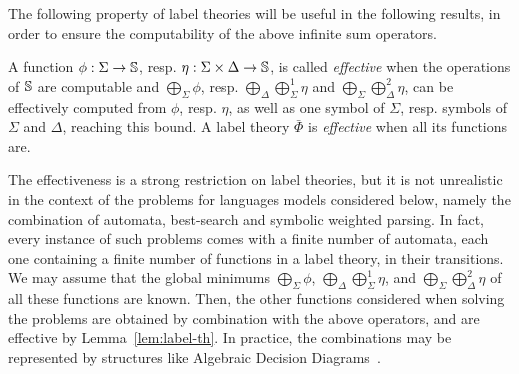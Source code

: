 



\noindent 
The following property of label theories will be useful in 
the following results, in order to ensure 
the computability of the above infinite sum operators.
%
\begin{definition}\label{def:effective}
A function $\phi: \Sigma \to \mathbb{S}$, 
resp. $\eta: \Sigma \times \Delta \to \mathbb{S}$,
is called \emph{effective} when 
the operations of $\mathbb{S}$ are computable and
$\bigoplus_{\Sigma} \phi$,
resp. $\bigoplus_{\Delta}\bigoplus^1_{\Sigma} \eta$ and $\bigoplus_{\Sigma}\bigoplus^2_{\Delta} \eta$,
can be effectively computed from $\phi$, resp. $\eta$, 
as well as one symbol of $\Sigma$, resp. symbols of $\Sigma$ and $\Delta$, 
reaching this bound.
%
A label theory $\bar\Phi$ is \emph{effective} when all its functions are.
\end{definition}

The effectiveness is a strong restriction on label theories, but it is
not unrealistic in the context of the problems for languages models considered below, 
namely the combination of automata, best-search and symbolic weighted parsing.
%
In fact, every instance of such problems comes with a finite number of automata, 
each one containing a finite number of functions in a label theory, in their transitions. 
We may assume that the global minimums $\bigoplus_{\Sigma} \phi$,
$\bigoplus_{\Delta}\bigoplus^1_{\Sigma} \eta$, and
$\bigoplus_{\Sigma}\bigoplus^2_{\Delta} \eta$
of all these functions are known.
%
Then, the other functions considered when solving the problems are obtained by combination with the above operators, and are effective by Lemma~\ref{lem:label-th}.
In practice, the combinations may be represented by structures like 
Algebraic Decision Diagrams~\cite{Bahar97ADD}.



